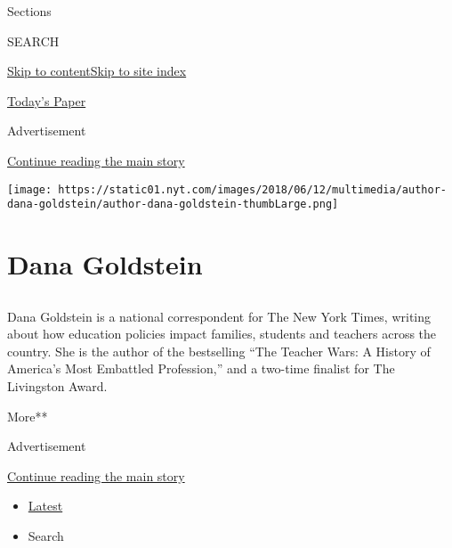 Sections

SEARCH

\protect\hyperlink{site-content}{Skip to
content}\protect\hyperlink{site-index}{Skip to site index}

\href{https://myaccount.nytimes.com/auth/login?response_type=cookie\&client_id=vi}{}

\href{https://www.nytimes.com/section/todayspaper}{Today's Paper}

Advertisement

\protect\hyperlink{after-top}{Continue reading the main story}

\texttt{[image: https://static01.nyt.com/images/2018/06/12/multimedia/author-dana-goldstein/author-dana-goldstein-thumbLarge.png]}

\hypertarget{dana-goldstein}{%
\section{Dana Goldstein}\label{dana-goldstein}}

\subsection{}

Dana Goldstein is a national correspondent for The New York Times,
writing about how education policies impact families, students and
teachers across the country. She is the author of the bestselling ``The
Teacher Wars: A History of America's Most Embattled Profession,'' and a
two-time finalist for The Livingston Award.

More**

Advertisement

\protect\hyperlink{after-mid1}{Continue reading the main story}

\begin{itemize}
\tightlist
\item
  \protect\hyperlink{stream-panel}{Latest}
\item
  Search
\end{itemize}

